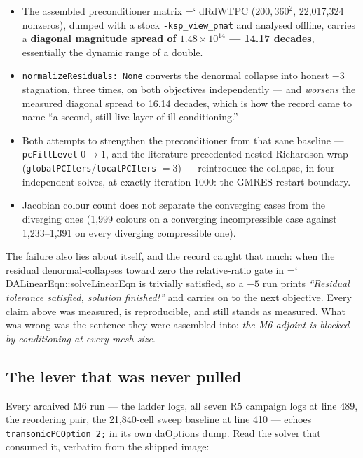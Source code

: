 \documentclass[11pt,a4paper]{article}
\newcommand{\artifact}[1]{{\small\ttfamily\hyphenchar\font=`\-\relax
  \def\_{\textunderscore\allowbreak}#1}}
\begin{document}
\begin{itemize}
\item The assembled preconditioner matrix \artifact{dRdWTPC} (\(200{,}360^2\), 22{,}017{,}324
nonzeros), dumped with a stock \texttt{-ksp\_view\_pmat} and analysed offline, carries a
\textbf{diagonal magnitude spread of \(1.48\times10^{14}\) --- 14.17 decades}, essentially the
dynamic range of a double.
\item \texttt{normalizeResiduals: None} converts the denormal collapse into honest \(-3\)
stagnation, three times, on both objectives independently --- and \emph{worsens} the measured
diagonal spread to 16.14 decades, which is how the record came to name ``a second, still-live
layer of ill-conditioning.''
\item Both attempts to strengthen the preconditioner from that sane baseline ---
\texttt{pcFillLevel} \(0\rightarrow1\), and the literature-precedented nested-Richardson wrap
(\texttt{globalPCIters}/\texttt{localPCIters} \(=3\)) --- reintroduce the collapse, in four
independent solves, at exactly iteration 1000: the GMRES restart boundary.
\item Jacobian colour count does not separate the converging cases from the diverging ones
(1{,}999 colours on a converging incompressible case against 1{,}233--1{,}391 on every
diverging compressible one).
\end{itemize}

The failure also lies about itself, and the record caught that much: when the residual
denormal-collapses toward zero the relative-ratio gate in
\artifact{DALinearEqn::\allowbreak solveLinearEqn} is trivially satisfied, so a \(-5\) run
prints \emph{``Residual tolerance satisfied, solution finished!''} and carries on to the next
objective. Every claim above was measured, is reproducible, and still stands as measured. What
was wrong was the sentence they were assembled into: \emph{the M6 adjoint is blocked by
conditioning at every mesh size}.

\subsection{The lever that was never pulled}

Every archived M6 run --- the ladder logs, all seven R5 campaign logs at line 489, the
reordering pair, the 21{,}840-cell sweep baseline at line 410 --- echoes
\texttt{transonicPCOption 2;} in its own daOptions dump. Read the solver that consumed it,
verbatim from the shipped image:
\end{document}
